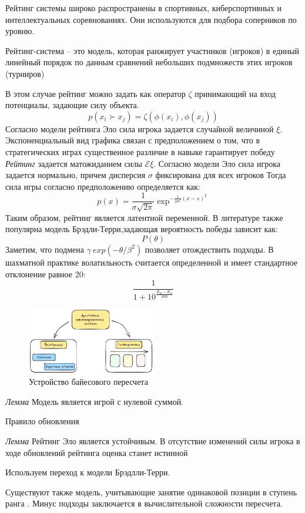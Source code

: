 
Рейтинг системы широко распространены в спортивных, киберспортивных и интеллектуальных соревнованиях.
Они используются для подбора соперников по уровню.


Рейтинг-система – это модель, которая ранжирует
участников (игроков) в единый линейный порядок по
данным сравнений небольших подмножеств этих игроков
(турниров)
 
В этом случае рейтинг можно задать как оператор $\zeta$ принимающий на вход потенциалы, задающие силу объекта.
\begin{equation}
    p(x_i \succ x_j) = \zeta(\phi(x_i),\phi(x_j))
\end{equation}
Согласно модели рейтинга Эло сила игрока задается случайной величиной $\xi$. 
Экспоненциальный вид графика связан с предположением о том, что в стратегических играх существенное различие в навыке гарантирует победу
\textit{Рейтинг} задается матожиданием силы $\mathcal{E} \xi$.
Согласно модели Эло сила игрока задается нормально, причем дисперсия $\sigma$ фиксирована для всех игроков
Тогда сила игры согласно предположению определяется как:
\begin{equation}
    p(x) = \frac{1}{\sigma \sqrt{2\pi}} \exp^{- \frac{1}{2\sigma^2}{(x-s)^2}}
\end{equation}
Таким образом, рейтинг является латентной переменной. В литературе также популярна модель Брэдли-Терри,задающая
вероятность победы зависит как:
\begin{equation}
    P(\theta)
\end{equation}
Заметим, что подмена $\gamma ~ exp(-\theta/\beta^2)$ позволяет отождествить подходы.
В шахматной практике волатильность считается определенной и имеет стандартное отклонение равное 20:
\begin{equation}
    \frac{1}{1+10^\frac{R_B-R_A}{400}} 
\end{equation}

\begin{figure}[h]
    \centering
    \includegraphics[width=0.5\textwidth]{assets/work/rating/bayes.excalidraw.png}
    \caption{Устройство байесового пересчета }
    \label{bayes}
\end{figure}

\textit{Лемма} Модель является игрой с нулевой суммой. 

 Правило обновления


\textit{Лемма} Рейтинг Эло является устойчивым. В отсутствие изменений силы игрока в ходе обновлений рейтинга оценка станет истинной

 Используем переход к модели Брэдлли-Терри.

Существуют также модель, учитывающие занятие одинаковой позиции в ступень ранга \cite{plackett1975analysis}\cite{luce2005individual}. 
Минус подходы заключается в вычислительной сложности пересчета.